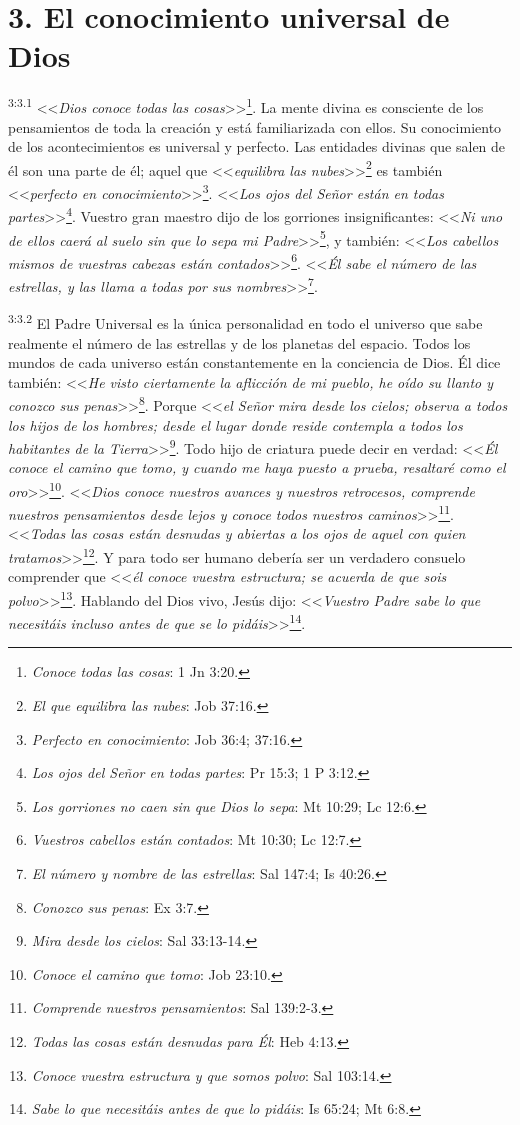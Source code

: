 \section*{3. El conocimiento universal de Dios}
\par
\textsuperscript{3:3.1} <<\textit{Dios conoce todas las cosas}>>\footnote{\textit{Conoce todas las cosas}: 1 Jn 3:20.}. La mente divina es consciente de los pensamientos de toda la creación y está familiarizada con ellos. Su conocimiento de los acontecimientos es universal y perfecto. Las entidades divinas que salen de él son una parte de él; aquel que <<\textit{equilibra las nubes}>>\footnote{\textit{El que equilibra las nubes}: Job 37:16.} es también <<\textit{perfecto en conocimiento}>>\footnote{\textit{Perfecto en conocimiento}: Job 36:4; 37:16.}. <<\textit{Los ojos del Señor están en todas partes}>>\footnote{\textit{Los ojos del Señor en todas partes}: Pr 15:3; 1 P 3:12.}. Vuestro gran maestro dijo de los gorriones insignificantes: <<\textit{Ni uno de ellos caerá al suelo sin que lo sepa mi Padre}>>\footnote{\textit{Los gorriones no caen sin que Dios lo sepa}: Mt 10:29; Lc 12:6.}, y también: <<\textit{Los cabellos mismos de vuestras cabezas están contados}>>\footnote{\textit{Vuestros cabellos están contados}: Mt 10:30; Lc 12:7.}. <<\textit{Él sabe el número de las estrellas, y las llama a todas por sus nombres}>>\footnote{\textit{El número y nombre de las estrellas}: Sal 147:4; Is 40:26.}.

\par
\textsuperscript{3:3.2} El Padre Universal es la única personalidad en todo el universo que sabe realmente el número de las estrellas y de los planetas del espacio. Todos los mundos de cada universo están constantemente en la conciencia de Dios. Él dice también: <<\textit{He visto ciertamente la aflicción de mi pueblo, he oído su llanto y conozco sus penas}>>\footnote{\textit{Conozco sus penas}: Ex 3:7.}. Porque <<\textit{el Señor mira desde los cielos; observa a todos los hijos de los hombres; desde el lugar donde reside contempla a todos los habitantes de la Tierra}>>\footnote{\textit{Mira desde los cielos}: Sal 33:13-14.}. Todo hijo de criatura puede decir en verdad: <<\textit{Él conoce el camino que tomo, y cuando me haya puesto a prueba, resaltaré como el oro}>>\footnote{\textit{Conoce el camino que tomo}: Job 23:10.}. <<\textit{Dios conoce nuestros avances y nuestros retrocesos, comprende nuestros pensamientos desde lejos y conoce todos nuestros caminos}>>\footnote{\textit{Comprende nuestros pensamientos}: Sal 139:2-3.}. <<\textit{Todas las cosas están desnudas y abiertas a los ojos de aquel con quien tratamos}>>\footnote{\textit{Todas las cosas están desnudas para Él}: Heb 4:13.}. Y para todo ser humano debería ser un verdadero consuelo comprender que <<\textit{él conoce vuestra estructura; se acuerda de que sois polvo}>>\footnote{\textit{Conoce vuestra estructura y que somos polvo}: Sal 103:14.}. Hablando del Dios vivo, Jesús dijo: <<\textit{Vuestro Padre sabe lo que necesitáis incluso antes de que se lo pidáis}>>\footnote{\textit{Sabe lo que necesitáis antes de que lo pidáis}: Is 65:24; Mt 6:8.}.

